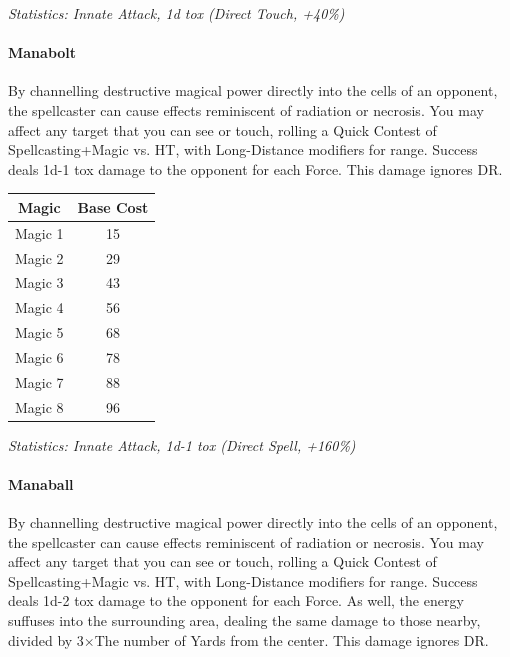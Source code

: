 \begin{multicols}{3}
	\textcolor{OliveGreen}{\textit{Statistics: Innate Attack, 1d tox (Direct Touch, +40\%)}}
	
	\paragraph{Manabolt}
	
	By channelling destructive magical power directly into the cells of an opponent, the spellcaster can cause effects reminiscent of radiation or necrosis. You may affect any target that you can see or touch, rolling a Quick Contest of Spellcasting+Magic vs. HT, with Long-Distance modifiers for range. Success deals 1d-1 tox damage to the opponent for each Force. This damage ignores DR.
	
	\begin{center}
		\begin{tabular}{|c|c|}
			\hline
			Magic & Base Cost \\
			\hline
			\hline
			Magic 1 & 15 \\
			Magic 2 & 29 \\
			Magic 3 & 43 \\
			Magic 4 & 56 \\
			Magic 5 & 68 \\
			Magic 6 & 78 \\
			Magic 7 & 88 \\
			Magic 8 & 96 \\
			\hline
		\end{tabular}
	\end{center}
	
	\textcolor{OliveGreen}{\textit{Statistics: Innate Attack, 1d-1 tox (Direct Spell, +160\%)}}
	
	\paragraph{Manaball}
	
	By channelling destructive magical power directly into the cells of an opponent, the spellcaster can cause effects reminiscent of radiation or necrosis. You may affect any target that you can see or touch, rolling a Quick Contest of Spellcasting+Magic vs. HT, with Long-Distance modifiers for range. Success deals 1d-2 tox damage to the opponent for each Force. As well, the energy suffuses into the surrounding area, dealing the same damage to those nearby, divided by 3\(\times\)The number of Yards from the center. This damage ignores DR. 
	

\end{multicols}
